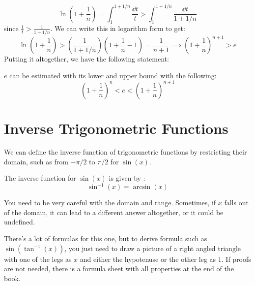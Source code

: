 \documentclass{article}
\begin{document}
 \begin{equation}
     \ln\left(1+\frac{1}{n}\right) = \int_{1}^{1+1/n} \frac{\dd{t}}{t} > \int_1^{1+1/n} \frac{\dd{t}}{1+1/n}
 \end{equation}
 since $\frac{1}{t}>\frac{1}{1+1/n}$. We can write this in logarithm form to get:
 \begin{equation}
     \ln\left(1+\frac{1}{n}\right)>\left(\frac{1}{1+1/n}\right)\left(1+\frac{1}{n}-1\right) = \frac{1}{n+1} \implies \left(1+\frac{1}{n}\right)^{n+1} > e
     \label{eq:}
 \end{equation}
 Putting it altogether, we have the following statement:
 \begin{idea}
     $e$ can be estimated with its lower and upper bound with the following:
     \begin{equation}
         \left(1+\frac{1}{n}\right)^n < e < \left(1+\frac{1}{n}\right)^{n+1}
     \end{equation}
 \end{idea}
 \section{Inverse Trigonometric Functions}
 We can define the inverse function of trigonometric functions by restricting their domain, such as from $-\pi/2$ to $\pi/2$ for $\sin(x)$.
    \begin{definition}
        The inverse function for $\sin(x)$ is given by :
        \begin{equation}
            \sin^{-1}(x) = \arcsin(x)
            \label{eq:}
        \end{equation}
    \end{definition}
\begin{warning}
    You need to be very careful with the domain and range. Sometimes, if $x$ falls out of the domain, it can lead to a different answer altogether, or it could be undefined.
\end{warning}
 There's a lot of formulas for this one, but to derive formula such as $\sin(\tan^{-1}(x))$, you just need to draw a picture of a right angled triangle with one of the legs as $x$ and either the hypotenuse or the other leg as $1$. If proofs are not needed, there is a formula sheet with all properties at the end of the book.
\end{document}
